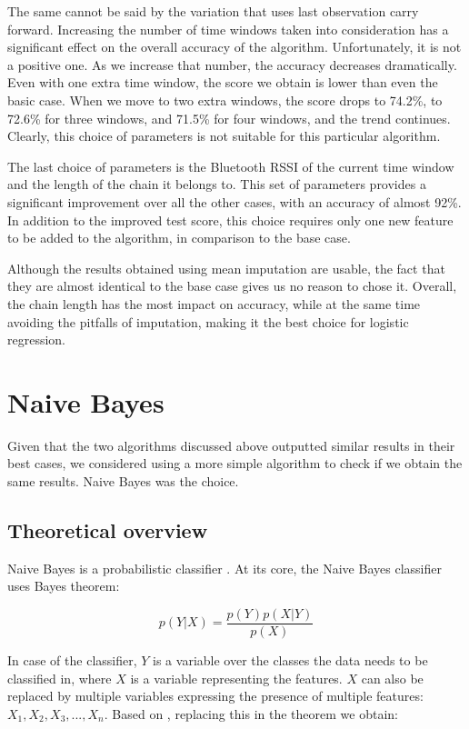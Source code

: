 The same cannot be said by the variation that uses last observation carry forward. Increasing the number of time windows taken into consideration has a significant effect on the overall accuracy of the algorithm. Unfortunately, it is not a positive one. As we increase that number, the accuracy decreases dramatically. Even with one extra time window, the score we obtain is lower than even the basic case. When we move to two extra windows, the score drops to 74.2\%, to 72.6\% for three windows, and 71.5\% for four windows, and the trend continues. Clearly, this choice of parameters is not suitable for this particular algorithm. 

The last choice of parameters is the Bluetooth RSSI of the current time window and the length of the chain it belongs to. This set of parameters provides a significant improvement over all the other cases, with an accuracy of almost 92\%. In addition to the improved test score, this choice requires only one new feature to be added to the algorithm, in comparison to the base case.

Although the results obtained using mean imputation are usable, the fact that they are almost identical to the base case gives us no reason to chose it. Overall, the chain length has the most impact on accuracy, while at the same time avoiding the pitfalls of imputation, making it the best choice for logistic regression. 

\section{Naive Bayes}

Given that the two algorithms discussed above outputted similar results in their best cases, we considered using a more simple algorithm to check if we obtain the same results. Naive Bayes was the choice.

\subsection{Theoretical overview}

Naive Bayes is a probabilistic classifier \cite{forty}. At its core, the Naive Bayes classifier uses Bayes theorem:

\begin{equation*}
p(Y \vert X) = \frac{p(Y)p(X \vert Y)}{p(X)}
\end{equation*}

In case of the classifier, $Y$ is a variable over the classes the data needs to be classified in, where $X$ is a variable representing the features. $X$ can also be replaced by multiple variables expressing the presence of multiple features: $X_1,X_2,X_3,..., X_n $. Based on \cite{forty}, replacing this in the theorem we obtain:

